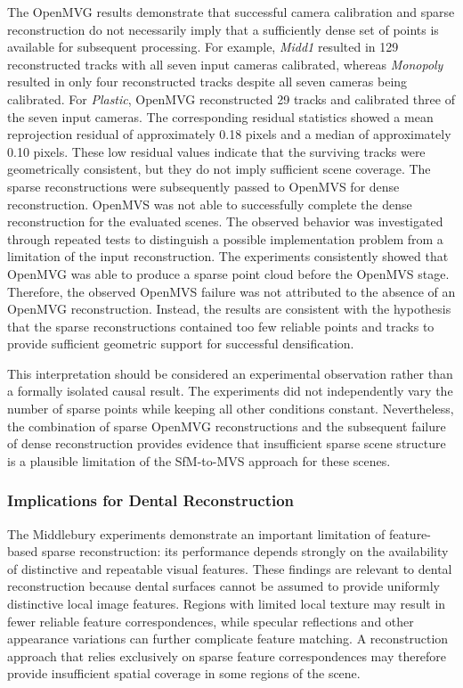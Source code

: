 The OpenMVG results demonstrate that successful camera calibration and sparse
reconstruction do not necessarily imply that a sufficiently dense set of
points is available for subsequent processing. For example, \textit{Midd1}
resulted in 129 reconstructed tracks with all seven input cameras calibrated,
whereas \textit{Monopoly} resulted in only four reconstructed tracks despite
all seven cameras being calibrated.
For \textit{Plastic}, OpenMVG reconstructed 29 tracks and calibrated three of
the seven input cameras. The corresponding residual statistics showed a mean
reprojection residual of approximately 0.18 pixels and a median of
approximately 0.10 pixels. These low residual values indicate that the
surviving tracks were geometrically consistent, but they do not imply
sufficient scene coverage.
The sparse reconstructions were subsequently passed to OpenMVS for dense
reconstruction. OpenMVS was not able to successfully complete the dense
reconstruction for the evaluated scenes. The observed behavior was
investigated through repeated tests to distinguish a possible implementation
problem from a limitation of the input reconstruction.
The experiments consistently showed that OpenMVG was able to produce a sparse
point cloud before the OpenMVS stage. Therefore, the observed OpenMVS failure
was not attributed to the absence of an OpenMVG reconstruction. Instead, the
results are consistent with the hypothesis that the sparse reconstructions
contained too few reliable points and tracks to provide sufficient geometric
support for successful densification.

This interpretation should be considered an experimental observation rather
than a formally isolated causal result. The experiments did not independently
vary the number of sparse points while keeping all other conditions constant.
Nevertheless, the combination of sparse OpenMVG reconstructions and the
subsequent failure of dense reconstruction provides evidence that insufficient
sparse scene structure is a plausible limitation of the SfM-to-MVS approach
for these scenes.

\subsubsection{Implications for Dental Reconstruction}

The Middlebury experiments demonstrate an important limitation of
feature-based sparse reconstruction: its performance depends strongly on the
availability of distinctive and repeatable visual features.
These findings are relevant to dental reconstruction because dental surfaces
cannot be assumed to provide uniformly distinctive local image features.
Regions with limited local texture may result in fewer reliable feature
correspondences, while specular reflections and other appearance variations
can further complicate feature matching. A reconstruction approach that relies
exclusively on sparse feature correspondences may therefore provide
insufficient spatial coverage in some regions of the scene.

